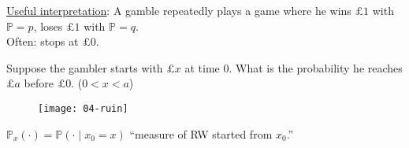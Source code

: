 \underline{Useful interpretation}: A gamble repeatedly plays a game where he wins $\pounds 1$ with $\mathbb{P} = p$, loses $\pounds 1$ with $\mathbb{P} = q$. \\
Often: stops at $\pounds 0$.

\begin{question}
    Suppose the gambler starts with $\pounds x$ at time $0$.
    What is the probability he reaches $\pounds a$ before $\pounds 0$. ($0 < x < a$)
\end{question} 

\begin{figure}[h] 
    \centering 
    \texttt{[image: 04-ruin]} 
\end{figure}

\begin{notation}
    $\mathbb{P}_x(\cdot) = \mathbb{P}(\cdot \mid x_0 = x)$ \color{blue} ``measure of RW started from $x_0$.''
\end{notation} 

